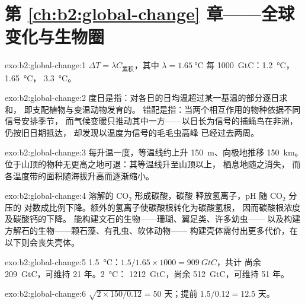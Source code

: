 \section*{第 \ref{ch:b2:global-change} 章——全球变化与生物圈}

\begin{solution}{exo:b2:global-change:1}
$\Delta T = \lambda C_{\text{累积}}$，其中 $\lambda = \qty{1.65}{\celsius}$
每 \qty{1000}{GtC}：\qty{1.2}{\celsius}，\qty{1.65}{\celsius}，
\qty{3.3}{\celsius}。
\end{solution}

\begin{solution}{exo:b2:global-change:2}
度日是指：对各日的日均温超过某一基温的部分逐日求和，
即支配植物与变温动物发育的。
错配是指：当两个相互作用的物种依据不同信号安排季节，
而气候变暖只推动其中一方——以日长为信号的捕蝇鸟在非洲，
仍按旧日期抵达，
却发现以温度为信号的毛毛虫高峰
已经过去两周。
\end{solution}

\begin{solution}{exo:b2:global-change:3}
每升温一度，等温线约上升 \qty{150}{m}、向极地推移 \qty{150}{km}。
位于山顶的物种无更高之地可退：其等温线升至山顶以上，
栖息地随之消失，
而各温度带的面积随海拔升高而逐渐缩小。
\end{solution}

\begin{solution}{exo:b2:global-change:4}
溶解的 \ensuremath{\mathrm{CO_2}} 形成碳酸，碳酸
释放氢离子，pH 随 \ensuremath{\mathrm{CO_2}} 分压的
对数成比例下降。额外的氢离子使碳酸根转化为碳酸氢根，
因而碳酸根浓度
及碳酸钙的下降。
能构建文石的生物——珊瑚、翼足类、许多幼虫——
以及构建方解石的生物——颗石藻、有孔虫、软体动物——
构建壳体需付出更多代价，在以下则会丧失壳体。
\end{solution}

\begin{solution}{exo:b2:global-change:5}
\qty{1.5}{\celsius}：$1.5/1.65\times 1000 = \qty{909}{GtC}$，共计
尚余 \qty{209}{GtC}，可维持 21 年。\qty{2}{\celsius}：
\qty{1212}{GtC}，尚余 \qty{512}{GtC}，可维持 51 年。
\end{solution}

\begin{solution}{exo:b2:global-change:6}
$\sqrt{2\times 150/0.12} = 50$ 天；提前 $1.5/0.12 = 12.5$
天。
\end{solution}

